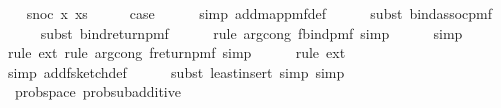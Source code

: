\begin{isabellebody}
\isamarkupfalse%
\isanewline
\ \ \isamarkupfalse%
\ {\isacharparenleft}{\kern0pt}snoc\ x\ xs{\isacharparenright}{\kern0pt}\isanewline
\ \ \isamarkupfalse%
\ \isamarkupfalse%
\ {\isacharquery}{\kern0pt}case\isanewline
\ \ \ \ \isamarkupfalse%
\ {\isacharparenleft}{\kern0pt}simp\ add{\isacharcolon}{\kern0pt}map{\isacharunderscore}{\kern0pt}pmf{\isacharunderscore}{\kern0pt}def{\isacharparenright}{\kern0pt}\isanewline
\ \ \ \ \isamarkupfalse%
\ {\isacharparenleft}{\kern0pt}subst\ bind{\isacharunderscore}{\kern0pt}assoc{\isacharunderscore}{\kern0pt}pmf{\isacharparenright}{\kern0pt}\isanewline
\ \ \ \ \isamarkupfalse%
\ {\isacharparenleft}{\kern0pt}subst\ bind{\isacharunderscore}{\kern0pt}return{\isacharunderscore}{\kern0pt}pmf{\isacharparenright}{\kern0pt}\isanewline
\ \ \ \ \isamarkupfalse%
\ {\isacharparenleft}{\kern0pt}rule\ arg{\isacharunderscore}{\kern0pt}cong{}{\isacharbrackleft}{\kern0pt}\ f{\isacharequal}{\kern0pt}{\isachardoublequoteopen}bind{\isacharunderscore}{\kern0pt}pmf{\isachardoublequoteclose}{\isacharbrackright}{\kern0pt}{\isacharcomma}{\kern0pt}\ simp{\isacharparenright}{\kern0pt}\isanewline
\ \ \ \ \isamarkupfalse%
\ {\isacharparenleft}{\kern0pt}simp{\isacharparenright}{\kern0pt}\isanewline
\ \ \ \ \isamarkupfalse%
\ {\isacharparenleft}{\kern0pt}rule\ ext{\isacharcomma}{\kern0pt}\ rule\ arg{\isacharunderscore}{\kern0pt}cong{\isacharbrackleft}{\kern0pt}\ f{\isacharequal}{\kern0pt}{\isachardoublequoteopen}return{\isacharunderscore}{\kern0pt}pmf{\isachardoublequoteclose}{\isacharbrackright}{\kern0pt}{\isacharcomma}{\kern0pt}\ simp{\isacharparenright}{\kern0pt}\isanewline
\ \ \ \ \isamarkupfalse%
\ {\isacharparenleft}{\kern0pt}rule\ ext{\isacharparenright}{\kern0pt}\isanewline
\ \ \ \ \isamarkupfalse%
\ {\isacharparenleft}{\kern0pt}simp\ add{\isacharcolon}{\kern0pt}f{}{\isacharunderscore}{\kern0pt}sketch{\isacharunderscore}{\kern0pt}def{\isacharparenright}{\kern0pt}\isanewline
\ \ \ \ \isamarkupfalse%
\ {\isacharparenleft}{\kern0pt}subst\ least{\isacharunderscore}{\kern0pt}insert{\isacharcomma}{\kern0pt}\ simp{\isacharcomma}{\kern0pt}\ simp{\isacharparenright}{\kern0pt}\isanewline
{}\isamarkupfalse%
%
\endisatagproof
{\isafoldproof}%
%
\isadelimproof
\isanewline
%
\endisadelimproof
\isanewline
{}\isamarkupfalse%
\ {\isacharparenleft}{\kern0pt}\ prob{\isacharunderscore}{\kern0pt}space{\isacharparenright}{\kern0pt}\ prob{\isacharunderscore}{\kern0pt}sub{\isacharunderscore}{\kern0pt}additive{\isacharcolon}{\kern0pt}\isanewline

\end{isabellebody}

